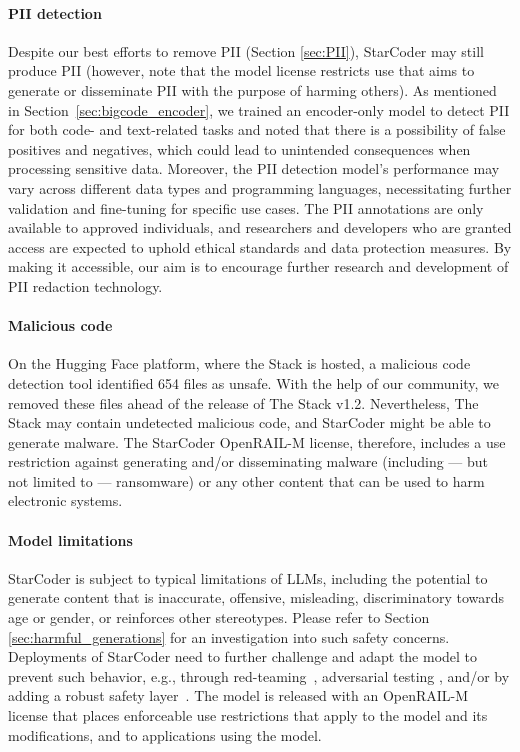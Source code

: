 \documentclass[10pt]{article} %
\begin{document}
\paragraph{PII detection} Despite our best efforts to remove PII (Section \ref{sec:PII}), StarCoder may still produce PII (however, note that the model license restricts use that aims to generate or disseminate PII with the purpose of harming others). As mentioned in Section~\ref{sec:bigcode_encoder}, %
we trained an encoder-only model to detect PII for both code- and text-related tasks and noted that there is a possibility of false positives and negatives, which could lead to unintended consequences when processing sensitive data. Moreover, the PII detection model's performance may vary across different data types and programming languages, necessitating further validation and fine-tuning for specific use cases. The PII annotations are only available to approved individuals, and researchers and developers who are granted access are expected to uphold ethical standards and data protection measures. By making it accessible, our aim is to encourage further research and development of PII redaction technology. 

\paragraph{Malicious code} On the Hugging Face platform, where the Stack is hosted, a malicious code detection tool identified 654 files as unsafe. With the help of our community, we removed these files ahead of the release of The Stack v1.2. Nevertheless, The Stack may contain undetected malicious code, and StarCoder might be able to generate malware. The StarCoder OpenRAIL-M license, therefore, includes a use restriction against generating and/or disseminating malware (including --- but not limited to --- ransomware) or any other content that can be used to harm electronic systems.

\paragraph{Model limitations} StarCoder is subject to typical limitations of LLMs, including the potential to generate  content that is inaccurate, offensive, misleading, discriminatory towards age or gender, or reinforces other stereotypes. Please refer to Section \ref{sec:harmful_generations} for an investigation into such safety concerns. Deployments of StarCoder need to further challenge and adapt the model to prevent such behavior, e.g., through red-teaming~\citep{perez2022red}, adversarial testing \citep{wan2023poisoning}, and/or by adding a robust safety layer~\citep{openai2023systemcard}. The model is released with an OpenRAIL-M license that places enforceable use restrictions that apply to the model and its modifications, and to applications using the model. 
\end{document}

